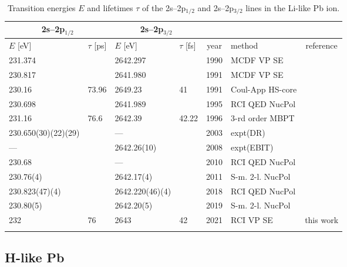 \begin{table*}[htbp!]\centering
    \caption{\normalsize{Transition energies $E$ and lifetimes $\tau$ of the 2s--2p$_{1/2}$ and 2s--2p$_{3/2}$ lines in the Li-like Pb ion.}}
    \vspace{0.1cm}
    \begin{tabular}{llllclc}
        \hline\hline
        \multicolumn{2}{c}{2s--2p$_{1/2}$} & 
        \multicolumn{2}{c}{2s--2p$_{3/2}$} \\
        \hline
        $E$ [eV]       &$\tau$ [ps] &  $E$ [eV]       & $\tau$ [fs] & year & method & \multicolumn{1}{c}{reference} \\
        \hline 
        231.374        && 2642.297        && 1990 & MCDF VP SE & \cite{IndelicatoDesclaux} \\
        230.817        && 2641.980        && 1991 & MCDF VP SE & \cite{Kim} \\
        230.16 & 73.96  & 2649.23 & 41     & 1991 & Coul-App HS-core & \cite{TheodosiouCurtisEl-Mekki:1991} \\ 
        230.698        && 2641.989        && 1995 & RCI QED NucPol & \cite{ChenChengJohnsonSapirstein} \\
        231.16 & 76.6   & 2642.39 & 42.22  & 1996 & 3-rd order MBPT & \cite{JohnsonLiuSapirstein:1996} \\
        230.650(30)(22)(29) &&  ---    && 2003 & expt(DR) & \cite{Brandau:2003} \\
        ---           && 2642.26(10)     && 2008 & expt(EBIT) &  \cite{Zhang} \\
        230.68         &&  ---            && 2010 & RCI QED NucPol & \cite{Kozhedub} \\ 
        230.76(4)      && 2642.17(4)      && 2011 & S-m. 2-l. NucPol & \cite{SapirsteinCheng} \\
        230.823(47)(4) && 2642.220(46)(4) && 2018 & RCI QED NucPol & \cite{YerokhinSurzhykov:2018a,YerokhinSurzhykov:2018b} \\
        230.80(5)      && 2642.20(5)      && 2019 & S-m. 2-l. NucPol & \cite{pcSapirsteinCheng} \\
        232 & 76   & 2643 & 42 & 2021 & RCI VP SE & this work \\       
        \hline \hline
        \vspace{0.1cm}
        \end{tabular}
    \label{table.Li-like-Pb}
\end{table*}

\subsection{H-like Pb}
\label{section.H-like-Pb}

